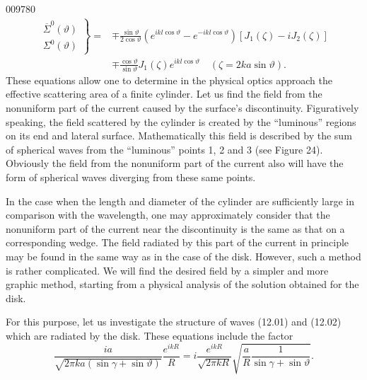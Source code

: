 \begin{scanpage}{0097}{80}
\[\begin{aligned}\left.\begin{matrix}\overline\Sigma^0(\vartheta)\\\Sigma^0(\vartheta)\end{matrix}\right\}={}&\mp\frac{\sin\vartheta}{2\cos\vartheta}(e^{ikl\cos\vartheta}-e^{-ikl\cos\vartheta})[J_1(\zeta)-iJ_2(\zeta)]\\&\mp\frac{\cos\vartheta}{\sin\vartheta}J_1(\zeta)e^{ikl\cos\vartheta}\quad(\zeta=2ka\sin\vartheta).
\end{aligned}\tag{13.29}\]
These equations allow one to determine in the physical optics approach the effective scattering area of a finite cylinder.
Let us find the field from the nonuniform part of the current caused by the surface's discontinuity. Figuratively speaking, the field scattered by the cylinder is created by the ``luminous'' regions on its end and lateral surface. Mathematically this field is described by the sum of spherical waves from the ``luminous'' points 1, 2 and 3 (see Figure 24). Obviously the field from the nonuniform part of the current also will have the form of spherical waves diverging from these same points.

In the case when the length and diameter of the cylinder are sufficiently large in comparison with the wavelength, one may approximately consider that the nonuniform part of the current near the discontinuity is the same as that on a corresponding wedge. The field radiated by this part of the current in principle may be found in the same way as in the case of the disk. However, such a method is rather complicated. We will find the desired field by a simpler and more graphic method, starting from a physical analysis of the solution obtained for the disk.

For this purpose, let us investigate the structure of waves (12.01) and (12.02) which are radiated by the disk. These equations include the factor
\[\frac{ia}{\sqrt{2\pi ka(\sin\gamma+\sin\vartheta)}}\frac{e^{ikR}}R=i\frac{e^{ikR}}{\sqrt{2\pi kR}}\sqrt{\frac aR\frac1{\sin\gamma+\sin\vartheta}}.\tag{14.01}\]
\end{scanpage}
